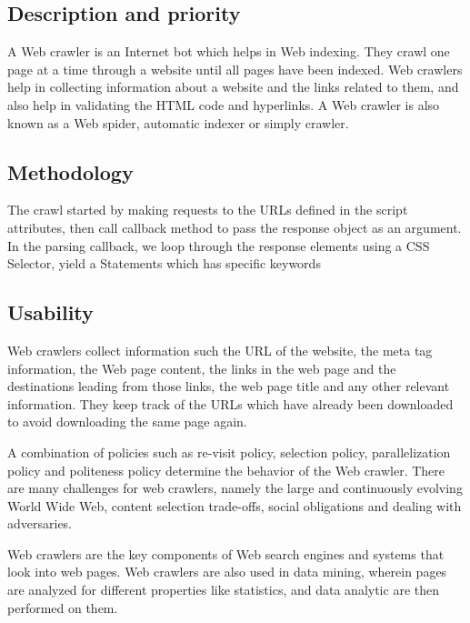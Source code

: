 \documentclass{scrreprt}
\begin{document}
\subsection{Description and priority}
A Web crawler is an Internet bot which helps in Web indexing. They crawl one page at a time through a website until all pages have been indexed. Web crawlers help in collecting information about a website and the links related to them, and also help in validating the HTML code and hyperlinks.
A Web crawler is also known as a Web spider, automatic indexer or simply crawler.

\subsection{Methodology}

The crawl started by making requests to the URLs defined in the script attributes, then call callback method to pass the response object as an argument. In the parsing callback, we loop through the response elements using a CSS Selector, yield a Statements which has specific keywords



\subsection{Usability}
Web crawlers collect information such the URL of the website, the meta tag information, the Web page content, the links in the web page and the destinations leading from those links, the web page title and any other relevant information. They keep track of the URLs which have already been downloaded to avoid downloading the same page again.

A combination of policies such as re-visit policy, selection policy, parallelization policy and politeness policy determine the behavior of the Web crawler. There are many challenges for web crawlers, namely the large and continuously evolving World Wide Web, content selection trade-offs, social obligations and dealing with adversaries.

Web crawlers are the key components of Web search engines and systems that look into web pages. Web crawlers are also used in data mining, wherein pages are analyzed for different properties like statistics, and data analytic are then performed on them.

\end{document}
